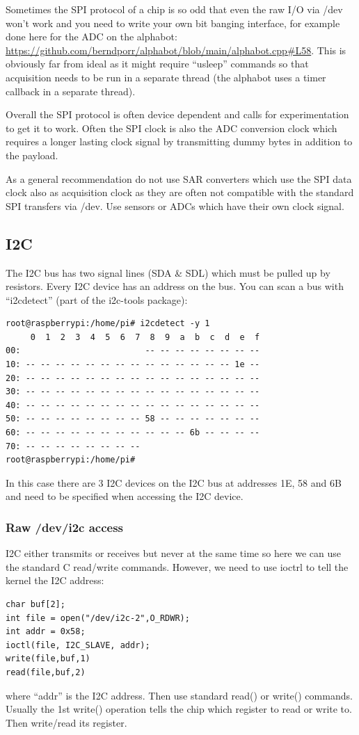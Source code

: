 \documentclass[12pt]{report}
\begin{document}
Sometimes the SPI protocol of a chip is so odd that even the raw
I/O via /dev won't work and you need to write your own bit banging
interface, for example done here for the ADC on the alphabot:
\url{https://github.com/berndporr/alphabot/blob/main/alphabot.cpp#L58}.
This is obviously far from ideal as it might require ``usleep'' commands
so that acquisition needs to be run in a separate thread (the alphabot
uses a timer callback in a separate thread).

Overall the SPI protocol is often device dependent and calls
for experimentation to get it to work. Often the SPI clock is also
the ADC conversion clock which requires a longer lasting clock signal
by transmitting dummy bytes in addition to the payload.

As a general recommendation do not use SAR converters which use the
SPI data clock also as acquisition clock as they are often not compatible
with the standard SPI transfers via /dev. Use sensors or ADCs which
have their own clock signal.


\subsection{I2C}
The I2C bus has two signal lines (SDA \& SDL) which must be pulled up
by resistors. Every I2C device has an address on the bus. You can scan
a bus with ``i2cdetect'' (part of the i2c-tools package):
\begin{verbatim}
root@raspberrypi:/home/pi# i2cdetect -y 1
     0  1  2  3  4  5  6  7  8  9  a  b  c  d  e  f
00:                         -- -- -- -- -- -- -- -- 
10: -- -- -- -- -- -- -- -- -- -- -- -- -- -- 1e -- 
20: -- -- -- -- -- -- -- -- -- -- -- -- -- -- -- -- 
30: -- -- -- -- -- -- -- -- -- -- -- -- -- -- -- -- 
40: -- -- -- -- -- -- -- -- -- -- -- -- -- -- -- -- 
50: -- -- -- -- -- -- -- -- 58 -- -- -- -- -- -- -- 
60: -- -- -- -- -- -- -- -- -- -- -- 6b -- -- -- -- 
70: -- -- -- -- -- -- -- --                         
root@raspberrypi:/home/pi# 
\end{verbatim}
In this case there are 3 I2C devices on the I2C bus at addresses
1E, 58 and 6B and need to be specified when
accessing the I2C device.

\subsubsection{Raw /dev/i2c access}
I2C either transmits or receives but never at the same time so here we
can use the standard C read/write commands. However, we need to use ioctrl to tell
the kernel the I2C address:
\begin{verbatim}
char buf[2];
int file = open("/dev/i2c-2",O_RDWR);
int addr = 0x58;
ioctl(file, I2C_SLAVE, addr);
write(file,buf,1)
read(file,buf,2)
\end{verbatim}
where ``addr'' is the I2C address. Then use standard read()
or write() commands. Usually the 1st write() operation tells the chip
which register to read or write to. Then write/read its register.
\end{document}
